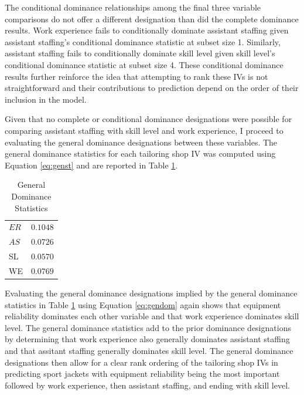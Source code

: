 \documentclass[ShortAfour,times,sageapa]{sagej}
\begin{document}
	The conditional dominance relationships among the final three variable comparisons do not offer a different designation than did the complete dominance results.
	Work experience fails to conditionally dominate assistant staffing given assistant staffing's conditional dominance statistic at subset size 1. 
	Similarly, assistant staffing fails to conditionally dominate skill level given skill level's conditional dominance statistic at subset size 4.
	These conditional dominance results further reinforce the idea that attempting to rank these IVs is not straightforward and their contributions to prediction depend on the order of their inclusion in the model. 
	
	Given that no complete or conditional dominance designations were possible for comparing assistant staffing with skill level and work experience, I proceed to evaluating the general dominance designations between these variables. 
	The general dominance statistics for each tailoring shop IV was computed using Equation \ref{eq:genst} and are reported in Table \ref{tab:gen}.
	
	\begin{table}[h!]
		\centering
		\caption{\centering General Dominance Statistics}
		\begin{tabular}{l|r}
			\toprule
			$ER$ & $0.1048$ \\ 
			$AS$ & $0.0726$ \\ 
			SL & $0.0570$ \\ 
			WE & $0.0769$ \\ 
			\bottomrule
		\end{tabular}
		\label{tab:gen}
	\end{table}

	Evaluating the general dominance designations implied by the general dominance statistics in Table \ref{tab:gen} using Equation \ref{eq:gendom} again shows that equipment reliability dominates each other variable and that work experience dominates skill level. 
	The general dominance statistics add to the prior dominance designations by determining that work experience also generally dominates assistant staffing and that assitant staffing generally dominates skill level.
	The general dominance designations then allow for a clear rank ordering of the tailoring shop IVs in predicting sport jackets with equipment reliability being the most important followed by work experience, then assistant staffing, and ending with skill level.
	
\end{document}
